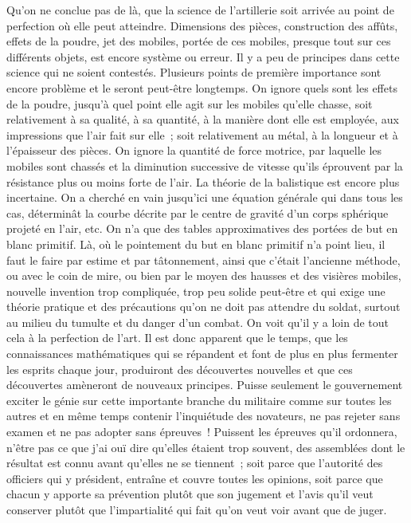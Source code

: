 \documentclass[french,twoside]{book} %
\begin{document}
Qu’on ne conclue pas de là, que la science de l’artillerie soit arrivée au point de perfection où elle peut atteindre. Dimensions des pièces, construction des affûts, effets de la poudre, jet des mobiles, portée de ces mobiles, presque tout sur ces différents objets, est encore système ou erreur. Il y a peu de principes dans cette science qui ne soient contestés. Plusieurs points de première importance sont encore problème et le seront peut-être longtemps. On ignore quels sont les effets de la poudre, jusqu’à quel point elle agit sur les mobiles qu’elle chasse, soit relativement à sa qualité, à sa quantité, à la manière dont elle est employée, aux impressions que l’air fait sur elle ; soit relativement au métal, à la longueur et à l’épaisseur des pièces. On ignore la quantité de force motrice, par laquelle les mobiles sont chassés et la diminution successive de vitesse qu’ils éprouvent par la résistance plus ou moins forte de l’air. La théorie de la balistique est encore plus incertaine. On a cherché en vain jusqu’ici une équation générale qui dans tous les cas, déterminât la courbe décrite par le centre de gravité d’un corps sphérique projeté en l’air, etc. On n’a que des tables approximatives des portées de but en blanc primitif. Là, où le pointement du but en blanc primitif n’a point lieu, il faut le faire par estime et par tâtonnement, ainsi que c’était l’ancienne méthode, ou avec le coin de mire, ou bien par le moyen des hausses et des visières mobiles, nouvelle invention trop compliquée, trop peu solide peut-être et qui exige une théorie pratique et des précautions qu’on ne doit pas attendre du soldat, surtout au milieu du tumulte et du danger d’un combat. On voit qu’il y a loin de tout cela à la perfection de l’art. Il est donc apparent que le temps, que les connaissances mathématiques qui se répandent et font de plus en plus fermenter les esprits chaque jour, produiront des découvertes nouvelles et que ces découvertes amèneront de nouveaux principes. Puisse seulement le gouvernement exciter le génie sur cette importante branche du militaire comme sur toutes les autres et en même temps contenir l’inquiétude des novateurs, ne pas rejeter sans examen et ne pas adopter sans épreuves ! Puissent les épreuves qu’il ordonnera, n’être pas ce que j’ai ouï dire qu’elles étaient trop souvent, des assemblées dont le résultat est connu avant qu’elles ne se tiennent ; soit parce que l’autorité des officiers qui y président, entraîne et couvre toutes les opinions, soit parce que chacun y apporte sa prévention plutôt que son jugement et l’avis qu’il veut conserver plutôt que l’impartialité qui fait qu’on veut voir avant que de juger.\par
\end{document}
